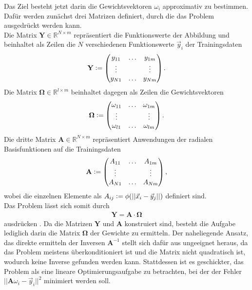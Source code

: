 Das Ziel besteht jetzt darin die Gewichtsvektoren $\omega_i$ approximativ zu bestimmen. Dafür werden zunächst drei Matrizen definiert, durch die das Problem ausgedrückt werden kann.\\
Die Matrix $\mathbf{Y} \in \mathbb{R}^{N \times m}$ repräsentiert die Funktionswerte der Abbildung und beinhaltet als Zeilen die $N$ verschiedenen Funktionswerte $\vec{y}_i$ der Trainingsdaten
\begin{align}
\mathbf{Y} \vcentcolon=
\begin{pmatrix}
y_{11} & \ldots  & y_{1m} \\
\vdots & & \vdots \\
y_{N1} & \ldots  & y_{Nm} \\
\end{pmatrix}.
\end{align}
Die Matrix $\mathbf{\Omega} \in \mathbb{R}^{l \times m}$ beinhaltet dagegen als Zeilen die Gewichtsvektoren
\begin{align}
\mathbf{\Omega} \vcentcolon=
\begin{pmatrix}
\omega_{11} & \ldots  & \omega_{1m} \\
\vdots & & \vdots \\
\omega_{l1} & \ldots  & \omega_{lm} \\
\end{pmatrix}.
\end{align}
Die dritte Matrix $\mathbf{A} \in \mathbb{R}^{N \times m}$ repräsentiert Anwendungen der radialen Basisfunktionen auf die Trainingsdaten 
\begin{align}
\mathbf{A} \vcentcolon=
\begin{pmatrix}
A_{11} & \ldots  & A_{1m} \\
\vdots & & \vdots \\
A_{N1} & \ldots  & A_{Nm} \\
\end{pmatrix},
\end{align}
wobei die einzelnen Elemente als $A_{ij} \vcentcolon= \phi(|| \vec{x}_i - \vec{y}_j ||)$ definiert sind.\\
Das Problem lässt sich somit durch
\begin{align}
\mathbf{Y} = \mathbf{A} \cdot \mathbf{\Omega}
\end{align}
ausdrücken \citep{lowe2multi}. Da die Matrizen $\mathbf{Y}$ und $\mathbf{A}$ konstruiert sind, besteht die Aufgabe lediglich darin die Matrix $\mathbf{\Omega}$ der Gewichte zu ermitteln. Der naheliegende Ansatz, das direkte ermitteln der Inversen $\mathbf{A}^{-1}$ stellt sich dafür aus ungeeignet heraus, da das Problem meistens überkonditioniert ist und die Matrix nicht quadratisch ist, wodurch keine Inverse gefunden werden kann. Stattdessen ist es geschickter, das Problem als eine lineare Optimierungsaufgabe zu betrachten, bei der der Fehler $||\mathbf{A} \omega_i - \vec{y}_i||^2$ minimiert werden soll.\\
